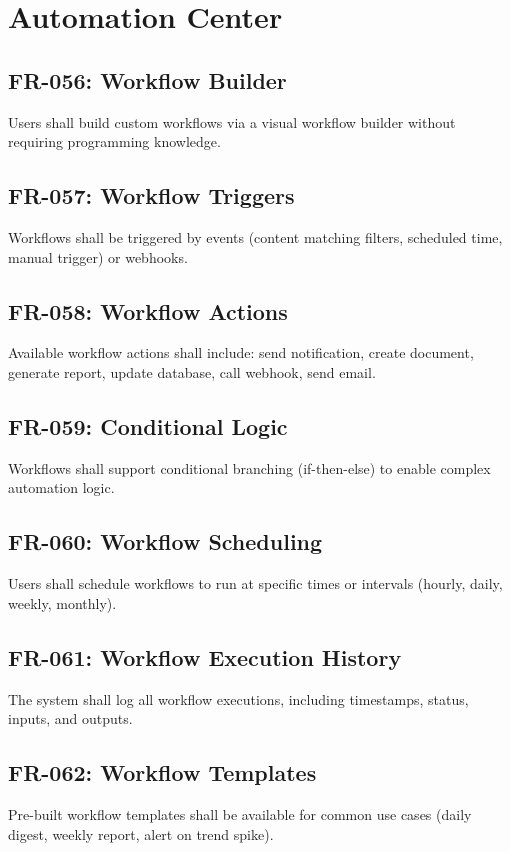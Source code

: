 \documentclass{report}
\begin{document}
\section{Automation Center}

\subsection{FR-056: Workflow Builder}
Users shall build custom workflows via a visual workflow builder without requiring programming knowledge.

\subsection{FR-057: Workflow Triggers}
Workflows shall be triggered by events (content matching filters, scheduled time, manual trigger) or webhooks.

\subsection{FR-058: Workflow Actions}
Available workflow actions shall include: send notification, create document, generate report, update database, call webhook, send email.

\subsection{FR-059: Conditional Logic}
Workflows shall support conditional branching (if-then-else) to enable complex automation logic.

\subsection{FR-060: Workflow Scheduling}
Users shall schedule workflows to run at specific times or intervals (hourly, daily, weekly, monthly).

\subsection{FR-061: Workflow Execution History}
The system shall log all workflow executions, including timestamps, status, inputs, and outputs.

\subsection{FR-062: Workflow Templates}
Pre-built workflow templates shall be available for common use cases (daily digest, weekly report, alert on trend spike).
\end{document}
